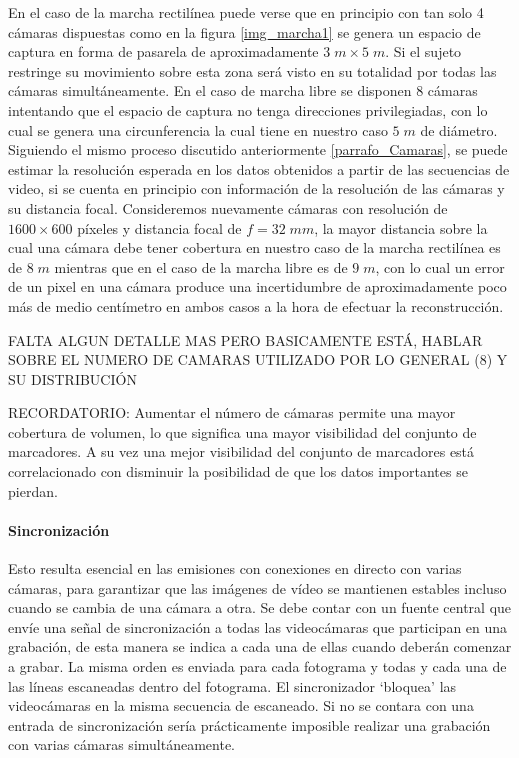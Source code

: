 En el caso de la marcha rectilínea puede verse que en principio con tan solo 4 cámaras dispuestas como en la figura \ref{img_marcha1} se genera un espacio de captura en forma de pasarela de aproximadamente $3\;m\times5\; m$. Si el sujeto restringe su movimiento sobre esta zona será visto en su totalidad por todas las cámaras simultáneamente. En el caso de marcha libre se disponen 8 cámaras intentando que el espacio de captura no tenga direcciones privilegiadas, con lo cual se genera una circunferencia la cual tiene en nuestro caso $5\;m$ de diámetro. \\
Siguiendo el mismo proceso discutido anteriormente \ref{parrafo_Camaras}, se puede estimar la resolución esperada en los datos obtenidos a partir de las secuencias de video, si se cuenta en principio con información de la resolución de las cámaras y su distancia focal. Consideremos nuevamente cámaras con resolución de $1600\times600$ píxeles y distancia focal de $f=32\;mm$, la mayor distancia sobre la cual una cámara debe tener cobertura en nuestro caso de la marcha rectilínea es de $8 \;m$ mientras que en el caso de la marcha libre es de $9\;m$, con lo cual un error de un pixel en una cámara produce una incertidumbre de aproximadamente poco más de medio centímetro en ambos casos a la hora de efectuar la reconstrucción. 

FALTA ALGUN DETALLE MAS PERO BASICAMENTE ESTÁ, HABLAR SOBRE EL NUMERO DE CAMARAS UTILIZADO POR LO GENERAL (8) Y SU DISTRIBUCIÓN

RECORDATORIO: Aumentar el número de cámaras permite una mayor cobertura de volumen, lo que significa una mayor visibilidad del conjunto de marcadores. A su vez una mejor visibilidad del conjunto de marcadores está correlacionado con disminuir la posibilidad de que los datos importantes se pierdan.


\paragraph{Sincronización \cite{canon}}

Esto resulta esencial en las emisiones con conexiones en directo con varias cámaras, para garantizar que las imágenes de vídeo se mantienen estables incluso cuando se cambia de una cámara a otra.
Se debe contar con un fuente central que envíe una señal de sincronización a todas las videocámaras que participan en una grabación, de esta manera se indica a cada una de ellas cuando deberán comenzar a grabar. La misma orden es enviada para cada fotograma y todas y cada una de las líneas escaneadas dentro del fotograma. El sincronizador ‘bloquea’ las videocámaras en la misma secuencia de escaneado.
Si no se contara con una entrada de sincronización sería prácticamente imposible realizar una grabación con varias cámaras simultáneamente.

